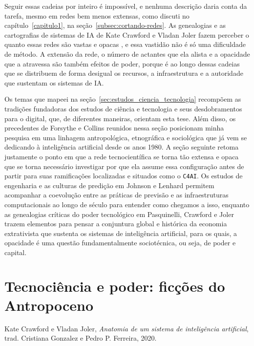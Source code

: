 Seguir essas cadeias por inteiro é impossível, e nenhuma descrição daria conta da tarefa, mesmo em redes bem menos extensas, como discuti no capítulo~\ref{capitulo1}, na seção~\ref{subsec:cortando-redes}. As genealogias e as cartografias de sistemas de IA de Kate Crawford e Vladan Joler fazem perceber o quanto essas redes são vastas e opacas \parencite{Crawford2018Anatomy}, e essa vastidão não é só uma dificuldade de método. A extensão da rede, o número de actantes que ela alista e a opacidade que a atravessa são também efeitos de poder, porque é ao longo dessas cadeias que se distribuem de forma desigual os recursos, a infraestrutura e a autoridade que sustentam os sistemas de IA.

Os temas que mapeei na seção~\ref{sec:estudos_ciencia_tecnologia} recompõem as tradições fundadoras dos estudos de ciência e tecnologia e seus desdobramentos para o digital, que, de diferentes maneiras, orientam esta tese. Além disso, os precedentes de Forsythe e Collins reunidos nessa seção posicionam minha pesquisa em uma linhagem antropológica, etnográfica e sociológica que já vem se dedicando à inteligência artificial desde os anos 1980. A seção seguinte retoma justamente o ponto em que a rede tecnocientífica se torna tão extensa e opaca que se torna necessário investigar por que ela assume essa configuração antes de partir para suas ramificações localizadas e situados como o \texttt{C4AI}. Os estudos de engenharia e as culturas de predição em Johnson e Lenhard permitem acompanhar a coevolução entre as práticas de previsão e as infraestruturas computacionais ao longo de século para entender como chegamos a isso, enquanto as genealogias críticas do poder tecnológico em Pasquinelli, Crawford e Joler trazem elementos para pensar a conjuntura global e histórica da economia extrativista que sustenta os sistemas de inteligência artificial, para os quais, a opacidade é uma questão fundamentalmente sociotécnica, ou seja, de poder e capital.

\section{Tecnociência e poder: ficções do Antropoceno}
\label{sec:predicao_poder}

%
{Kate Crawford e Vladan Joler, \textit{Anatomia de um sistema de inteligência artificial}, trad. Cristiana Gonzalez e Pedro P. Ferreira, 2020.}

